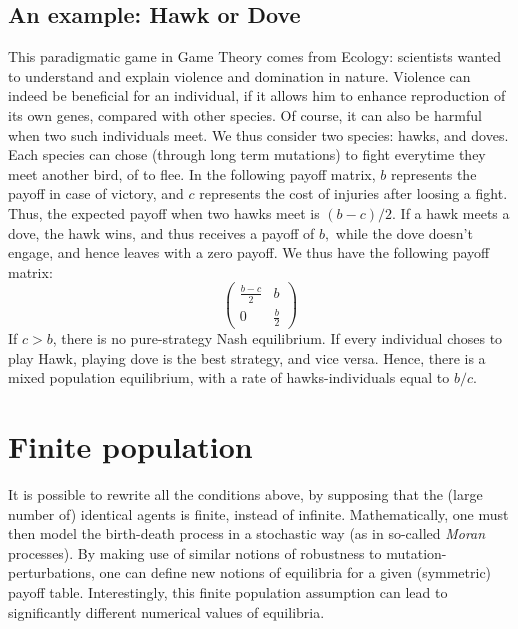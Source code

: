 \subsection{An example: Hawk or Dove}
This paradigmatic game in Game Theory comes from Ecology: scientists wanted to understand and explain violence and domination in nature.  Violence can indeed be beneficial for an individual, if it allows him to enhance reproduction of its own genes, compared with other species.  Of course, it can also be harmful when two such individuals meet. We thus consider two species: hawks, and doves.  Each species can chose (through long term mutations) to fight everytime they meet another bird, of to flee. In the following payoff matrix, $b$ represents the payoff in case of victory, and $c$ represents the cost of injuries after loosing a fight.  Thus, the expected payoff when two hawks meet is $(b-c)/2.$  If a hawk meets a dove, the hawk wins, and thus receives a payoff of $b,$ while the dove doesn't engage, and hence leaves with a zero payoff. We thus have the following payoff matrix:
\[
\begin{pmatrix}
	\frac{b-c}{2} & b \\
	0 & \frac{b}{2}
\end{pmatrix}
\]
If $c>b$, there is no pure-strategy Nash equilibrium.  If every individual choses to play Hawk, playing dove is the best strategy, and vice versa.  Hence, there is a mixed population equilibrium, with a rate of hawks-individuals equal to $b/c.$
%


\section{Finite population}
It is possible to rewrite all the conditions above, by supposing that the (large number of) identical agents is finite, instead of infinite.  Mathematically, one must then model the birth-death process in a stochastic way (as in so-called \emph{Moran} processes). By making use of similar notions of robustness to mutation-perturbations, one can define new notions of equilibria for a given (symmetric) payoff table.
Interestingly, this finite population assumption can lead to significantly different numerical values of equilibria.


\ifx \globalmark \undefined %



\else

\fi
